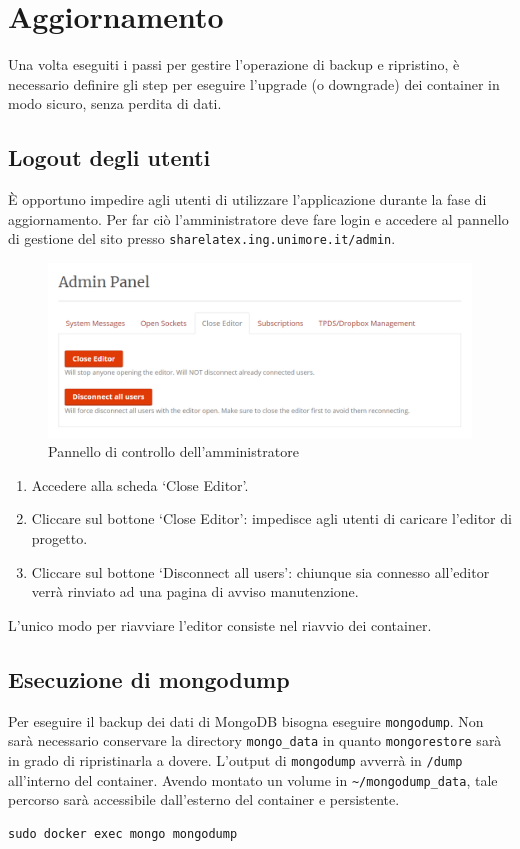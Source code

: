 \section{Aggiornamento}
Una volta eseguiti i passi per gestire l'operazione di backup e ripristino, è necessario definire gli step per eseguire l'upgrade (o downgrade) dei container in modo sicuro, senza perdita di dati.

\subsection{Logout degli utenti}
È opportuno impedire agli utenti di utilizzare l'applicazione durante la fase di aggiornamento. Per far ciò l'amministratore deve fare login e accedere al pannello di gestione del sito presso \verb|sharelatex.ing.unimore.it/admin|.
\begin{figure}[h]
    \centering
    \includegraphics[width=\textwidth]{immagini/close_editor.PNG}
    \caption{Pannello di controllo dell'amministratore}
    \label{fig:close_editor}
\end{figure}
\begin{enumerate}
    \item Accedere alla scheda \enquote*{Close Editor}.
    \item Cliccare sul bottone \enquote*{Close Editor}: impedisce agli utenti di caricare l'editor di progetto.
    \item Cliccare sul bottone \enquote*{Disconnect all users}: chiunque sia connesso all'editor verrà rinviato ad una pagina di avviso manutenzione.
\end{enumerate}
L'unico modo per riavviare l'editor consiste nel riavvio dei container.

\subsection{Esecuzione di mongodump}
Per eseguire il backup dei dati di MongoDB bisogna eseguire \verb|mongodump|. Non sarà necessario conservare la directory \verb|mongo_data| in quanto \verb|mongorestore| sarà in grado di ripristinarla a dovere. L'output di \verb|mongodump| avverrà in \verb|/dump| all'interno del container. Avendo montato un volume in \verb|~/mongodump_data|, tale percorso sarà accessibile dall'esterno del container e persistente.
\begin{lstlisting}
sudo docker exec mongo mongodump
\end{lstlisting}

